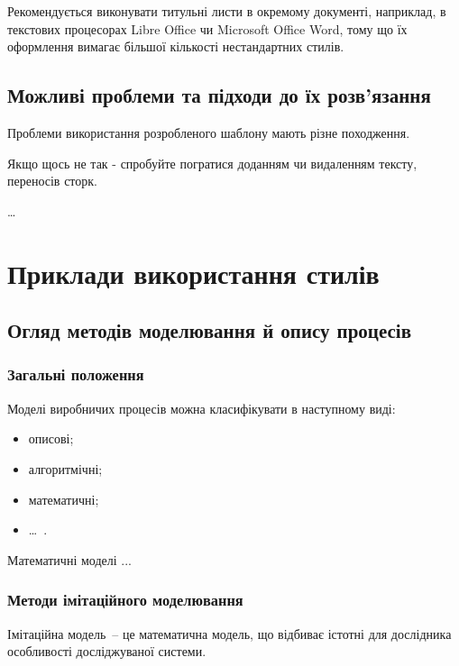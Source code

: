 Рекомендується виконувати титульні листи в окремому документі, наприклад, в
текстових процесорах Libre Office чи Microsoft Office Word, тому що їх
оформлення вимагає більшої кількості нестандартних стилів.

\subsection{Можливі проблеми та підходи до їх розв'язання}

Проблеми використання розробленого шаблону мають різне походження.

Якщо щось не так - спробуйте погратися доданням чи видаленням тексту, переносів
сторк.

\begin{longEnumerate}
\item \ldots 
\end{longEnumerate}

\section{Приклади використання стилів}

\subsection{Огляд методів моделювання й опису процесів}
\subsubsection{Загальні положення}
Моделі виробничих процесів можна класифікувати в наступному виді:
\begin{itemize}
\item описові;
\item алгоритмічні;
\item математичні;
\item \dots~.
\end{itemize}

Математичні моделі ...

\subsubsection{Методи імітаційного моделювання}
Імітаційна модель~-- це математична модель, що відбиває істотні для дослідника особливості досліджуваної системи.

